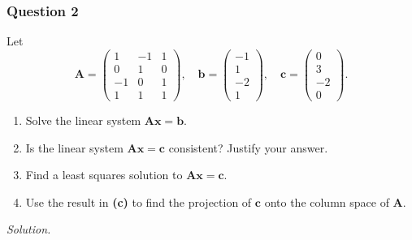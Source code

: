 \documentclass[12pt]{article}
\begin{document}
\subsubsection*{Question 2}
Let 
\[
\mathbf{A} = \begin{pmatrix}
1 & -1 & 1 \\
0 & 1 & 0 \\
-1 & 0 & 1 \\
1 & 1 & 1
\end{pmatrix},\quad
\mathbf{b} = \begin{pmatrix}
-1 \\ 1 \\ -2 \\ 1
\end{pmatrix},\quad
\mathbf{c} = \begin{pmatrix}
0 \\ 3 \\ -2 \\ 0
\end{pmatrix}.
\]
\begin{enumerate}[label=\textbf{(\alph*)}]
\itemsep 0em
    \item Solve the linear system \(\mathbf{Ax}=\mathbf{b}\).
    
    \item Is the linear system \(\mathbf{Ax}=\mathbf{c}\) consistent? Justify your answer.
    
    \item Find a least squares solution to \(\mathbf{Ax}=\mathbf{c}\).
    \item Use the result in \textbf{(c)} to find the projection of \(\mathbf{c}\) onto the column space of \(\mathbf{A}\).
\end{enumerate}
\noindent\emph{Solution.}
\end{document}

